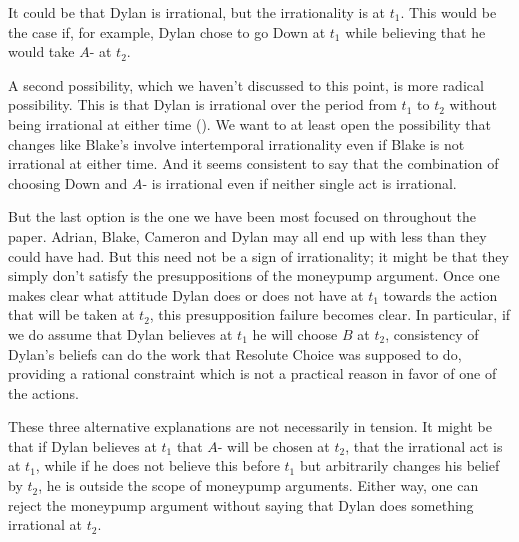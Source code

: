 \documentclass[
  11pt,
  letterpaper]{article}
\begin{document}

It could be that Dylan is irrational, but the irrationality is at $t_1$. This would be the case if, for example, Dylan chose to go Down at $t_1$ while believing that he would take $A$- at $t_2$.

A second possibility, which we haven't discussed to this point, is more radical possibility. This is that Dylan is irrational over the period from $t_1$ to $t_2$ without being irrational at either time (\citet[p. 12]{weatherson2008decision}). We want to at least open the possibility that changes like Blake's involve intertemporal irrationality even if Blake is not irrational at either time. And it seems consistent to say that the combination of choosing Down and $A$- is irrational even if neither single act is irrational.

But the last option is the one we have been most focused on throughout the paper. Adrian, Blake, Cameron and Dylan may all end up with less than they could have had. But this need not be a sign of irrationality; it might be that they simply don't satisfy the presuppositions of the moneypump argument. Once one makes clear what attitude Dylan does or does not have at $t_1$ towards the action that will be taken at $t_2$, this presupposition failure becomes clear. In particular, if we do assume that Dylan believes at $t_1$ he will choose $B$ at $t_2$, consistency of Dylan's beliefs can do the work that Resolute Choice was supposed to do, providing a rational constraint which is not a practical reason in favor of one of the actions.

These three alternative explanations are not necessarily in tension. It might be that if Dylan believes at $t_1$ that $A$- will be chosen at $t_2$, that the irrational act is at $t_1$, while if he does not believe this before $t_1$ but arbitrarily changes his belief by $t_2$, he is outside the scope of moneypump arguments. Either way, one can reject the moneypump argument without saying that Dylan does something irrational at $t_2$.



\end{document}
